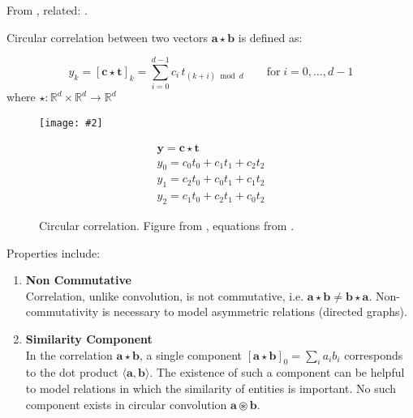 \documentclass{article}
\makeatletter
\DeclareRobustCommand{\ie}{i.e.\@\xspace}
\newcommand{\tbf}[1]{\textbf{#1}}
\newcommand{\gph}[2]{\texttt{[image: \#2]}}
\makeatother
\begin{document}
From \cite{nickel2016holographic,plate1995holographic}, related: \cite{tay2017learning}.

Circular correlation between two vectors $\mathbf{a} \star \mathbf{b}$ is defined as:

\begin{equation}
    y_k = \left[\mathbf{c} \star \mathbf{t}\right]_{k} = \sum_{i=0}^{d-1} c_{i} \, t_{(k+i) \bmod d} \qquad \text{for} \; i = 0, \dotsc, d-1
\end{equation}
\noindent
where $\star : \mathbb{R}^{d} \times \mathbb{R}^{d} \rightarrow \mathbb{R}^{d}$

\begin{figure}[h]
\begin{minipage}{0.5\linewidth}
    \begin{center}
    \gph{0.5}{images/circular_correlation.png}
    \end{center}
\end{minipage}
\begin{minipage}{0.5\linewidth}
    \begin{equation}
        \begin{array}{c}{\mathbf{y} = \mathbf{c} \star \mathbf{t}} \\ {y_{0}=c_{0} t_{0}+c_{1} t_{1}+c_{2} t_{2}} \\ {y_{1}=c_{2} t_{0}+c_{0} t_{1}+c_{1} t_{2}} \\ {y_{2}=c_{1} t_{0}+c_{2} t_{1}+c_{0} t_{2}}\end{array}
    \end{equation}
\end{minipage}
\caption{Circular correlation. Figure from \cite{plate1995holographic}, equations from \cite{plate1995holographic,nickel2016holographic}.}
\end{figure}

Properties include:

\begin{enumerate}[label=\roman*)]
    \item {\tbf{Non Commutative} \\
            Correlation, unlike convolution, is not commutative, \ie{} $\mathbf{a} \star \mathbf{b} \neq \mathbf{b} \star \mathbf{a}$. Non-commutativity is necessary to model asymmetric relations (directed graphs).}
    \item {\tbf{Similarity Component} \\
            In the correlation $\mathbf{a} \star \mathbf{b}$, a single component $[\mathbf{a} \star \mathbf{b}]_{0}=\sum_{i} a_{i} b_{i}$ corresponds to the dot product $\langle\mathbf{a}, \mathbf{b}\rangle$. The existence of such a component can be helpful to model relations in which the similarity of entities is important. No such component exists in circular convolution $\mathbf{a} \circledast \mathbf{b}$.}
\end{enumerate}
\end{document}
